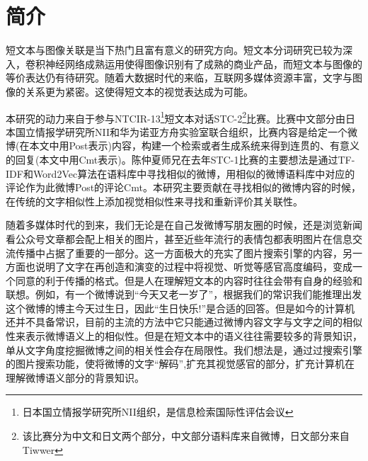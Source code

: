 \chapter{简介}
短文本与图像关联是当下热门且富有意义的研究方向。短文本分词研究已较为深入，卷积神经网络成熟运用使得图像识别有了成熟的商业产品，而短文本与图像的等价表达仍有待研究。随着大数据时代的来临，互联网多媒体资源丰富，文字与图像的关系更为紧密。这使得短文本的视觉表达成为可能。

本研究的动力来自于参与NTCIR-13\footnote{日本国立情报学研究所NII组织，是信息检索国际性评估会议}短文本对话STC-2\footnote{该比赛分为中文和日文两个部分，中文部分语料库来自微博，日文部分来自Tiwwer }比赛。比赛中文部分由日本国立情报学研究所NII和华为诺亚方舟实验室联合组织，比赛内容是给定一个微博(在本文中用Post表示)内容，构建一个检索或者生成系统来得到连贯的、有意义的回复(本文中用Cmt表示)。陈仲夏师兄在去年STC-1比赛的主要想法是通过TF-IDF和Word2Vec算法在语料库中寻找相似的微博，用相似的微博语料库中对应的评论作为此微博Post的评论Cmt。本研究主要贡献在寻找相似的微博内容的时候，在传统的文字相似性上添加视觉相似性来寻找和重新评价其关联性。

随着多媒体时代的到来，我们无论是在自己发微博写朋友圈的时候，还是浏览新闻看公众号文章都会配上相关的图片，甚至近些年流行的表情包都表明图片在信息交流传播中占据了重要的一部分。这一方面极大的充实了图片搜索引擎的内容，另一方面也说明了文字在再创造和演变的过程中将视觉、听觉等感官高度编码，变成一个同意的利于传播的格式。但是人在理解短文本的内容时往往会带有自身的经验和联想。例如，有一个微博说到“今天又老一岁了”，根据我们的常识我们能推理出发这个微博的博主今天过生日，因此“生日快乐!”是合适的回答。但是如今的计算机还并不具备常识，目前的主流的方法中它只能通过微博内容文字与文字之间的相似性来表示微博语义上的相似性。但是在短文本中的语义往往需要较多的背景知识，单从文字角度挖掘微博之间的相关性会存在局限性。我们想法是，通过过搜索引擎的图片搜索功能，使将微博的文字“解码”,扩充其视觉感官的部分，扩充计算机在理解微博语义部分的背景知识。




